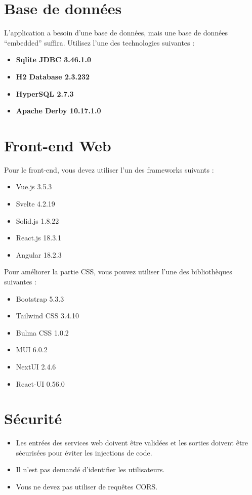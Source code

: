 \documentclass{article}
\begin{document}
\section{Base de données}

L'application a besoin d'une base de données, mais une base de données ``embedded'' suffira. Utilisez l'une des technologies suivantes :
\begin{itemize}
    \item \textbf{Sqlite JDBC 3.46.1.0}
    \item \textbf{H2 Database 2.3.232}
    \item \textbf{HyperSQL 2.7.3}
    \item \textbf{Apache Derby 10.17.1.0}
\end{itemize}

\section{Front-end Web}

Pour le front-end, vous devez utiliser l'un des frameworks suivants :
\begin{itemize}
    \item Vue.js 3.5.3
    \item Svelte 4.2.19
    \item Solid.js 1.8.22
    \item React.js 18.3.1
    \item Angular 18.2.3
\end{itemize}

Pour améliorer la partie CSS, vous pouvez utiliser l'une des bibliothèques suivantes :
\begin{itemize}
    \item Bootstrap 5.3.3
    \item Tailwind CSS 3.4.10
    \item Bulma CSS 1.0.2
    \item MUI 6.0.2
    \item NextUI 2.4.6
    \item React-UI 0.56.0
\end{itemize}

\section{Sécurité}

\begin{itemize}
    \item Les entrées des services web doivent être validées et les sorties doivent être sécurisées pour éviter les injections de code.
    \item Il n'est pas demandé d'identifier les utilisateurs.
    \item Vous ne devez pas utiliser de requêtes CORS.
\end{itemize}
\end{document}
